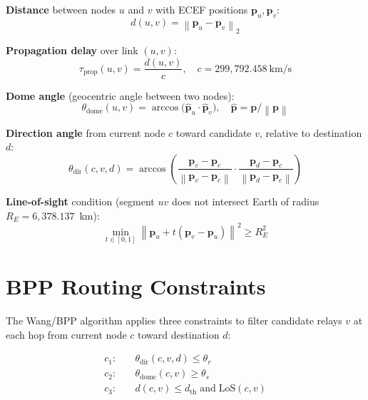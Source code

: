 \documentclass[12pt,a4paper]{report}
\newcommand{\Tprop}{\tau_{\mathrm{prop}}}
\newcommand{\RE}{R_E}
\newcommand{\dth}{d_{\mathrm{th}}}
\newcommand{\thetar}{\theta_r}
\newcommand{\thetas}{\theta_s}
\newcommand{\norm}[1]{\left\|#1\right\|}
\begin{document}
\textbf{Distance} between nodes $u$ and $v$ with ECEF positions $\mathbf{p}_u,\mathbf{p}_v$:
\begin{equation}
  d(u,v) = \norm{\mathbf{p}_u - \mathbf{p}_v}_2
\end{equation}

\textbf{Propagation delay} over link $(u,v)$:
\begin{equation}
  \Tprop(u,v) = \frac{d(u,v)}{c}, \quad c = 299{,}792.458~\text{km/s}
\end{equation}

\textbf{Dome angle} (geocentric angle between two nodes):
\begin{equation}
  \theta_{\mathrm{dome}}(u,v) = \arccos\!\bigl(\hat{\mathbf{p}}_u \cdot \hat{\mathbf{p}}_v\bigr),
  \quad \hat{\mathbf{p}} = \mathbf{p}/\norm{\mathbf{p}}
\end{equation}

\textbf{Direction angle} from current node $c$ toward candidate $v$, relative to destination $d$:
\begin{equation}
  \theta_{\mathrm{dir}}(c,v,d) =
    \arccos\!\left(
      \frac{\mathbf{p}_v-\mathbf{p}_c}{\norm{\mathbf{p}_v-\mathbf{p}_c}}
      \cdot
      \frac{\mathbf{p}_d-\mathbf{p}_c}{\norm{\mathbf{p}_d-\mathbf{p}_c}}
    \right)
\end{equation}

\textbf{Line-of-sight} condition (segment $uv$ does not intersect Earth of radius $\RE = 6{,}378.137$~km):
\begin{equation}
  \min_{t\in[0,1]}\norm{\mathbf{p}_u + t(\mathbf{p}_v-\mathbf{p}_u)}^2 \geq \RE^2
\end{equation}

\section{BPP Routing Constraints}

The Wang/BPP algorithm applies three constraints to filter candidate relays $v$ at each
hop from current node $c$ toward destination $d$:

\begin{align}
  c_1:\quad & \theta_{\mathrm{dir}}(c,v,d) \leq \thetar \label{eq:c1}\\
  c_2:\quad & \theta_{\mathrm{dome}}(c,v)  \geq \thetas  \label{eq:c2}\\
  c_3:\quad & d(c,v) \leq \dth \;\text{and}\; \mathrm{LoS}(c,v) \label{eq:c3}
\end{align}
\end{document}
